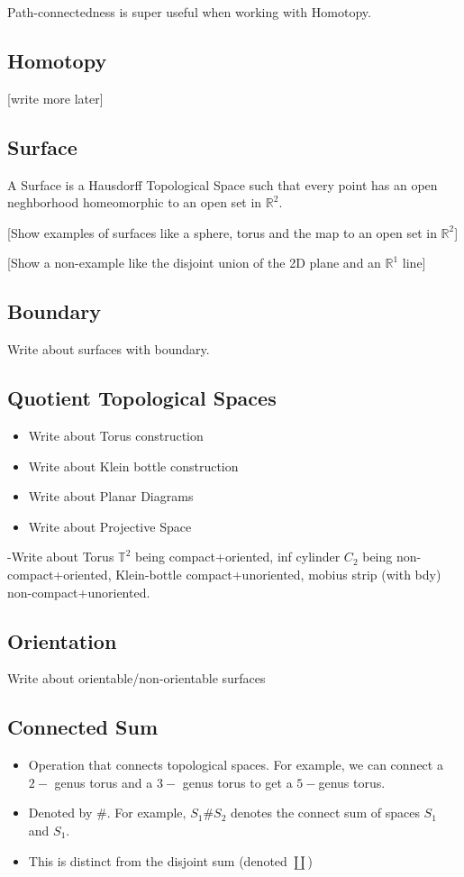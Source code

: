 \documentclass{article}
\newcommand{\R}{\mathbb{R}}
\begin{document}
\vskip 0.5cm
Path-connectedness is super useful when working with Homotopy. 

\vskip 0.5cm
\subsection*{Homotopy}
[write more later]

\vskip 0.5cm
\subsection*{Surface}
A Surface is a Hausdorff Topological Space such that every point has an open neghborhood homeomorphic to an open set in $\R^2$.

\vskip 0.25cm
[Show examples of surfaces like a sphere, torus and the map to an open set in $\R^2$]

\vskip 0.25cm
[Show a non-example like the disjoint union of the 2D plane and an $\R^1$ line]


\vskip 0.5cm
\subsection{Boundary}
Write about surfaces with boundary.

\vskip 0.5cm
\subsection{Quotient Topological Spaces}
\begin{itemize}
  \item Write about Torus construction
  \item Write about Klein bottle construction
  \item Write about Planar Diagrams
  \item Write about Projective Space
\end{itemize}

\vskip 0.5cm
-Write about Torus $\mathbb{T}^2$ being compact+oriented, inf cylinder $C_2$ being non-compact+oriented, Klein-bottle compact+unoriented, mobius strip (with bdy) non-compact+unoriented.

\vskip 0.5cm
\subsection{Orientation}
Write about orientable/non-orientable surfaces

\vskip 0.5cm
\subsection{Connected Sum}
\begin{itemize}
  \item Operation that connects topological spaces. For example, we can connect a $2-$ genus torus and a $3-$ genus torus to get a $5-$genus torus.
  \item Denoted by $\#$. For example, $S_1 \# S_2$ denotes the connect sum of spaces $S_1$ and $S_1$. 
  \item This is distinct from the disjoint sum (denoted $\coprod$)
\end{itemize}
\end{document}
